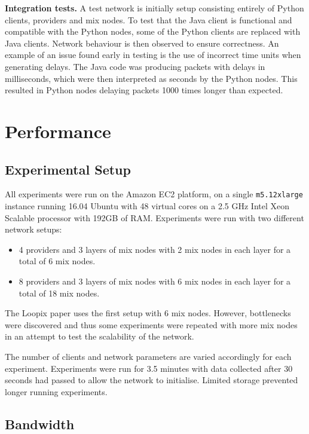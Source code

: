 \documentclass[final,dissertation.tex]{subfiles}
\begin{document}
\textbf{Integration tests.} A test network is initially setup consisting entirely of Python clients, providers and mix nodes. To test that the Java client is functional and compatible with the Python nodes, some of the Python clients are replaced with Java clients. Network behaviour is then observed to ensure correctness. An example of an issue found early in testing is the use of incorrect time units when generating delays. The Java code was producing packets with delays in milliseconds, which were then interpreted as seconds by the Python nodes. This resulted in Python nodes delaying packets 1000 times longer than expected.

\section{Performance}

\subsection{Experimental Setup}

All experiments were run on the Amazon EC2 platform, on a single \verb|m5.12xlarge| instance running 16.04 Ubuntu with 48 virtual cores on a 2.5 GHz Intel Xeon Scalable processor with 192GB of RAM. Experiments were run with two different network setups: 

\begin{itemize}
	\item 4 providers and 3 layers of mix nodes with 2 mix nodes in each layer for a total of 6 mix nodes.
	\item 8 providers and 3 layers of mix nodes with 6 mix nodes in each layer for a total of 18 mix nodes.
\end{itemize}

The Loopix paper uses the first setup with 6 mix nodes. However, bottlenecks were discovered and thus some experiments were repeated with more mix nodes in an attempt to test the scalability of the network.

The number of clients and network parameters are varied accordingly for each experiment. Experiments were run for 3.5 minutes with data collected after 30 seconds had passed to allow the network to initialise. Limited storage prevented longer running experiments.

\subsection{Bandwidth}
 
\end{document}
